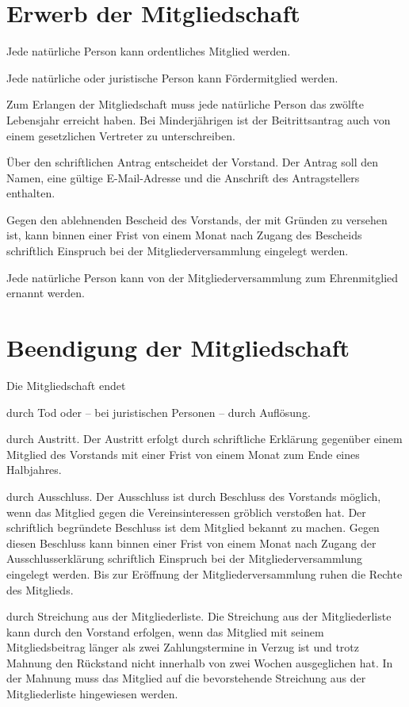 \section{Erwerb der Mitgliedschaft}
\begin{para}
	\item Jede natürliche Person kann ordentliches Mitglied werden.
	\item Jede natürliche oder juristische Person kann Fördermitglied werden.
	\item Zum Erlangen der Mitgliedschaft muss jede natürliche Person das zwölfte Lebensjahr erreicht haben. Bei Minderjährigen ist der Beitrittsantrag auch von einem gesetzlichen Vertreter zu unterschreiben.
	\item Über den schriftlichen Antrag entscheidet der Vorstand. Der Antrag soll den Namen, eine gültige E-Mail-Adresse und die Anschrift des Antragstellers ent\-halten.
	\item Gegen den ablehnenden Bescheid des Vorstands, der mit Gründen zu versehen ist, kann binnen einer Frist von einem Monat nach Zugang des Bescheids schriftlich Einspruch bei der Mitgliederversammlung eingelegt werden.
	\item Jede natürliche Person kann von der Mitgliederversammlung zum Ehrenmitglied ernannt werden.
\end{para}

\section{Beendigung der Mitgliedschaft}
Die Mitgliedschaft endet
\begin{para}
	\item durch Tod oder – bei juristischen Personen – durch Auflösung.
	\item durch Austritt.
	Der Austritt erfolgt durch schriftliche Erklärung gegenüber einem Mitglied des Vorstands mit einer Frist von einem Monat zum Ende eines Halbjahres.
	\item durch Ausschluss.
	Der Ausschluss ist durch Beschluss des Vorstands möglich, wenn das Mitglied gegen die Vereinsinteressen gröblich verstoßen hat. Der schriftlich begründete Beschluss ist dem Mitglied bekannt zu machen.
	Gegen diesen Beschluss kann binnen einer Frist von einem Monat nach Zugang der Ausschlusserklärung schriftlich Einspruch bei der Mitgliederversammlung eingelegt werden. Bis zur Eröffnung der Mitgliederversammlung ruhen die Rechte des Mitglieds.
	\item durch Streichung aus der Mitgliederliste.
	Die Streichung aus der Mitgliederliste kann durch den Vorstand erfolgen, wenn das Mitglied mit seinem Mitgliedsbeitrag länger als zwei Zahlungstermine in Verzug ist und trotz Mahnung den Rückstand nicht innerhalb von zwei Wochen ausgeglichen hat. In der Mahnung muss das Mitglied auf die bevorstehende Streichung aus der Mitgliederliste hingewiesen werden.
\end{para}

